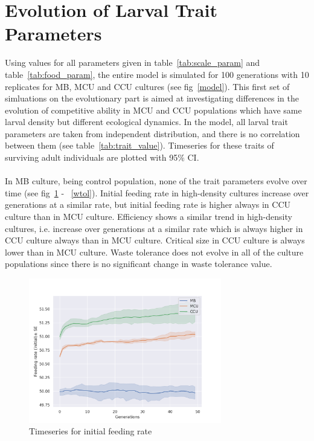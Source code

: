 \clearpage
\section{Evolution of Larval Trait Parameters}
Using values for all parameters given in table~\ref{tab:scale_param} and table~\ref{tab:food_param}, the entire model is simulated for 100 generations with 10 replicates for MB, MCU and CCU cultures (see fig~\ref{model}). This first set of simluations on the evolutionary part is aimed at investigating differences in the evolution of competitive ability in MCU and CCU populations which have same larval density but different ecological dynamics. In the model, all larval trait parameters are taken from independent distribution, and there is no correlation between them (see table~\ref{tab:trait_value}). Timeseries for these traits of surviving adult individuals are plotted with 95$\%$ CI.\\ \\
In MB culture, being control population, none of the trait parameters evolve over time (see fig~\ref{fr} - ~\ref{wtol}). Initial feeding rate in high-density cultures increase over generations at a similar rate, but initial feeding rate is higher always in CCU culture than in MCU culture. Efficiency shows a similar trend in high-density cultures, i.e. increase over generations at a similar rate which is always higher in CCU culture always than in MCU culture. Critical size in CCU culture is always lower than in MCU culture. Waste tolerance does not evolve in all of the culture populations since there is no significant change in waste tolerance value.
\begin{figure}[h]
  \centering
  \includegraphics[trim = 0 0 50 50, clip, width=0.75\textwidth]{C4/Figs/fr}
  \caption{Timeseries for initial feeding rate}
  \label{fr}
\end{figure}
